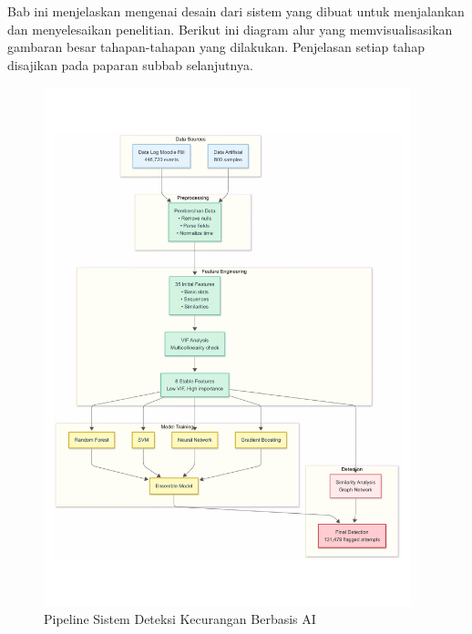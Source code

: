 \chapter{\babTiga}
\label{bab:3}
Bab ini menjelaskan mengenai desain dari sistem yang dibuat untuk menjalankan dan
menyelesaikan penelitian. Berikut ini diagram alur yang memvisualisasikan gambaran besar
tahapan-tahapan yang dilakukan. Penjelasan setiap tahap disajikan pada paparan subbab selanjutnya.

\begin{figure}[htbp]
    \centering
    \includegraphics[width=0.95\textwidth]{figures/pipeline_overview.pdf}
    \caption{Pipeline Sistem Deteksi Kecurangan Berbasis AI}
    \label{fig:pipeline_overview}
\end{figure}

